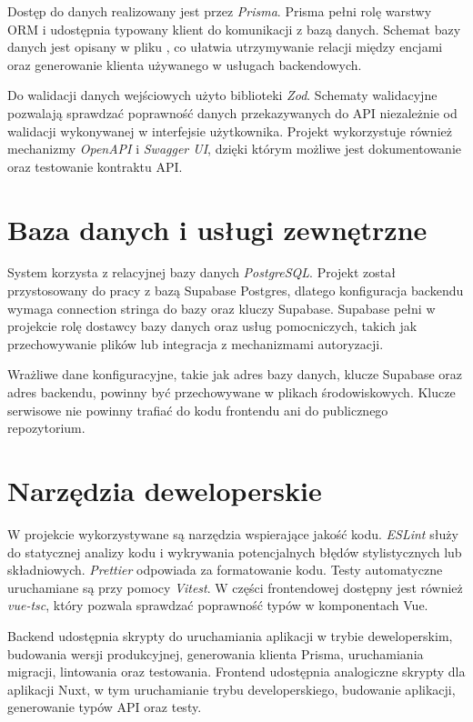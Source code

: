 Dostęp do danych realizowany jest przez \textit{Prisma}. Prisma pełni rolę warstwy ORM i udostępnia typowany klient do komunikacji z bazą danych. Schemat bazy danych jest opisany w pliku , co ułatwia utrzymywanie relacji między encjami oraz generowanie klienta używanego w usługach backendowych.

Do walidacji danych wejściowych użyto biblioteki \textit{Zod}. Schematy walidacyjne pozwalają sprawdzać poprawność danych przekazywanych do API niezależnie od walidacji wykonywanej w interfejsie użytkownika. Projekt wykorzystuje również mechanizmy \textit{OpenAPI} i \textit{Swagger UI}, dzięki którym możliwe jest dokumentowanie oraz testowanie kontraktu API.

\section{Baza danych i usługi zewnętrzne}
\label{sec:technologie-baza}

System korzysta z relacyjnej bazy danych \textit{PostgreSQL}. Projekt został przystosowany do pracy z bazą Supabase Postgres, dlatego konfiguracja backendu wymaga connection stringa do bazy oraz kluczy Supabase. Supabase pełni w projekcie rolę dostawcy bazy danych oraz usług pomocniczych, takich jak przechowywanie plików lub integracja z mechanizmami autoryzacji.

Wrażliwe dane konfiguracyjne, takie jak adres bazy danych, klucze Supabase oraz adres backendu, powinny być przechowywane w plikach środowiskowych. Klucze serwisowe nie powinny trafiać do kodu frontendu ani do publicznego repozytorium.

\section{Narzędzia deweloperskie}
\label{sec:narzedzia-deweloperskie}

W projekcie wykorzystywane są narzędzia wspierające jakość kodu. \textit{ESLint} służy do statycznej analizy kodu i wykrywania potencjalnych błędów stylistycznych lub składniowych. \textit{Prettier} odpowiada za formatowanie kodu. Testy automatyczne uruchamiane są przy pomocy \textit{Vitest}. W części frontendowej dostępny jest również \textit{vue-tsc}, który pozwala sprawdzać poprawność typów w komponentach Vue.

Backend udostępnia skrypty do uruchamiania aplikacji w trybie deweloperskim, budowania wersji produkcyjnej, generowania klienta Prisma, uruchamiania migracji, lintowania oraz testowania. Frontend udostępnia analogiczne skrypty dla aplikacji Nuxt, w tym uruchamianie trybu developerskiego, budowanie aplikacji, generowanie typów API oraz testy.


